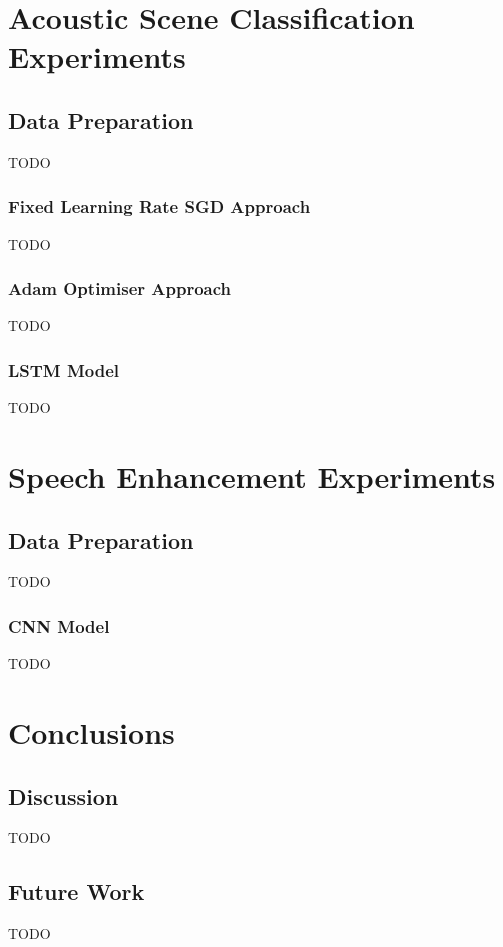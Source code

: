 \documentclass[logo,bsc,singlespacing,parskip,online]{infthesis}
\begin{document}
\chapter{Acoustic Scene Classification Experiments}
\section{Data Preparation}
TODO
\subsection{Fixed Learning Rate SGD Approach}
TODO
\subsection{Adam Optimiser Approach}
TODO
\subsection{LSTM Model}
TODO

\chapter{Speech Enhancement Experiments}
\section{Data Preparation}
TODO
\subsection{CNN Model}
TODO

\chapter{Conclusions}
\section{Discussion}
TODO
\section{Future Work}
TODO









\end{document}
